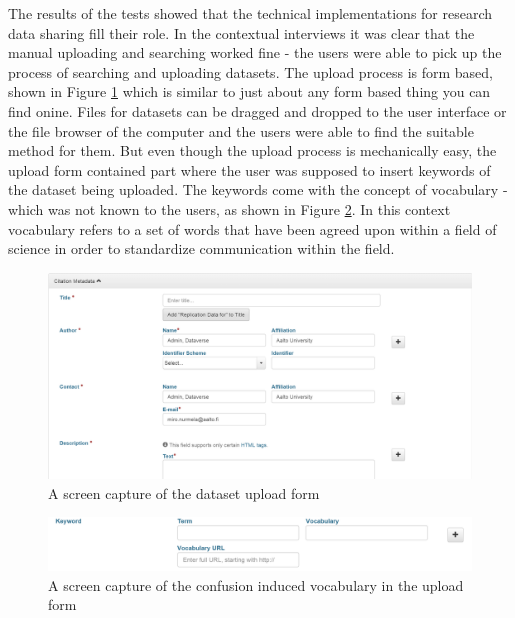 The results of the tests showed that the technical implementations for research
data sharing fill their role. In the contextual interviews it was clear that
the manual uploading and searching worked fine - the users were able to pick up
the process of searching and uploading datasets. The upload process is form
based, shown in Figure \ref{fig:upload} which is similar to just about any
form based thing you can find onine. Files for datasets can be dragged and
dropped to the user interface or the file browser of the computer and the users
were able to find the suitable method for them. But even
though the upload process is mechanically easy, the upload form contained part
where the user was supposed to insert keywords of the dataset being uploaded.
The keywords come with the concept of vocabulary - which was not known to the
users, as shown in Figure \ref{fig:vocabulary}. In this context vocabulary
refers to a set of words that have been agreed upon within a field of science
in order to standardize communication within the field.

\begin{figure}
    \begin{centering}
        \includegraphics[width=\textwidth]{images/upload}
    \end{centering}
    \caption{A screen capture of the dataset upload form}
    \label{fig:upload}
\end{figure}

\begin{figure}
    \begin{centering}
        \includegraphics[width=\textwidth]{images/vocabulary}
    \end{centering}
    \caption{A screen capture of the confusion induced vocabulary in the upload form}
    \label{fig:vocabulary}
\end{figure}

